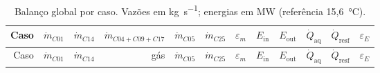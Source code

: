 \documentclass[11pt,a4paper]{article}
\numberwithin{equation}{section}
\numberwithin{table}{section}
\numberwithin{figure}{section}
\begin{document}
\begin{landscape}
\small
\begin{longtable}{rrrrrrrrrrrr}
\caption{Balanço global por caso. Vazões em \si{\kilogram\per\second}; energias em \si{\mega\watt} (referência 15,6~\si{\celsius}).}\label{tab:global}\\\toprule
Caso & $\dot m_{C01}$ & $\dot m_{C14}$ & $\dot m_{C04+C09+C17}$ & $\dot m_{C05}$ & $\dot m_{C25}$ & $\varepsilon_m$ & $E_{\mathrm{in}}$ & $E_{\mathrm{out}}$ & $\dot Q_{\mathrm{aq}}$ & $\dot Q_{\mathrm{resf}}$ & $\varepsilon_E$\\\midrule\endfirsthead
\toprule Caso & $\dot m_{C01}$ & $\dot m_{C14}$ & gás & $\dot m_{C05}$ & $\dot m_{C25}$ & $\varepsilon_m$ & $E_{\mathrm{in}}$ & $E_{\mathrm{out}}$ & $\dot Q_{\mathrm{aq}}$ & $\dot Q_{\mathrm{resf}}$ & $\varepsilon_E$\\\midrule\endhead


\end{longtable}
\end{landscape}
\end{document}
